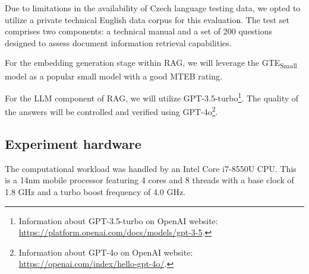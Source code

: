 Due to limitations in the availability of Czech language testing data, we opted to utilize a private technical English data corpus for this evaluation.
The test set comprises two components: a technical manual and a set of 200 questions designed to assess document information retrieval capabilities.

For the embedding generation stage within \ac{RAG}, we will leverage the GTE\textsubscript{Small} model as a popular small model with a good \ac{MTEB} rating.

For the \ac{LLM} component of \ac{RAG}, we will utilize GPT-3.5-turbo\footnote{Information about GPT-3.5-turbo on OpenAI website: \url{https://platform.openai.com/docs/models/gpt-3-5}.}.
The quality of the answers will be controlled and verified using GPT-4o\footnote{Information about GPT-4o on OpenAI website: \url{https://openai.com/index/hello-gpt-4o/}.}.


\subsection{Experiment hardware}
The computational workload was handled by an Intel Core i7-8550U CPU.
This is a 14nm mobile processor featuring 4 cores and 8 threads with a base clock of 1.8 GHz and a turbo boost frequency of 4.0 GHz.



